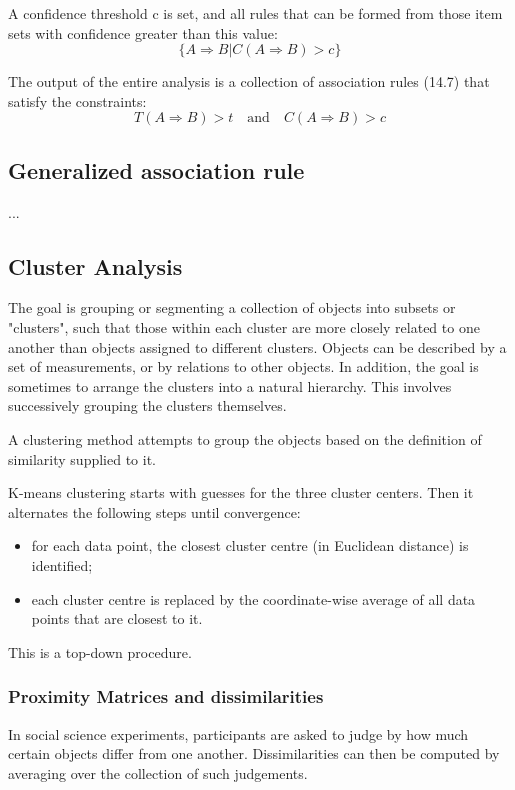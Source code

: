 \documentclass[12pt, letterpaper]{article}
\theoremstyle{definition}
\begin{document}
A confidence threshold c is set, and all rules that can be formed from those item sets with confidence greater than this value:
\begin{equation}
\{ A\Rightarrow B| C(A\Rightarrow B)>c\}
\end{equation}


The output of the entire analysis is a collection of association rules (14.7) that satisfy the constraints:
\begin{equation}
T(A \Rightarrow B) >t \quad \text{and}\quad C(A \Rightarrow B)>c
\end{equation}

\subsection{Generalized association rule}
...

\subsection{Cluster Analysis}
The goal is grouping or segmenting a collection of objects into subsets or "clusters", such that those within each cluster are more closely related to one another than objects assigned to different clusters. Objects can be described by a set of measurements, or by relations to other objects. In addition, the goal is sometimes to arrange the clusters into a natural hierarchy. This involves successively grouping the clusters themselves.

A clustering method attempts to group the objects based on the definition of similarity supplied to it.

K-means clustering starts with guesses for the three cluster centers. Then it alternates the following steps until convergence:
\begin{itemize}
\item  for each data point, the closest cluster centre (in Euclidean distance) is identified;
\item each cluster centre is replaced by the coordinate-wise average of all data points that are closest to it.
\end{itemize}

This is a top-down procedure.

\subsubsection{Proximity Matrices and dissimilarities}
In social science experiments, participants are asked to judge by how much certain objects differ from one another. Dissimilarities can then be computed by averaging over the collection of such judgements.
\end{document}
